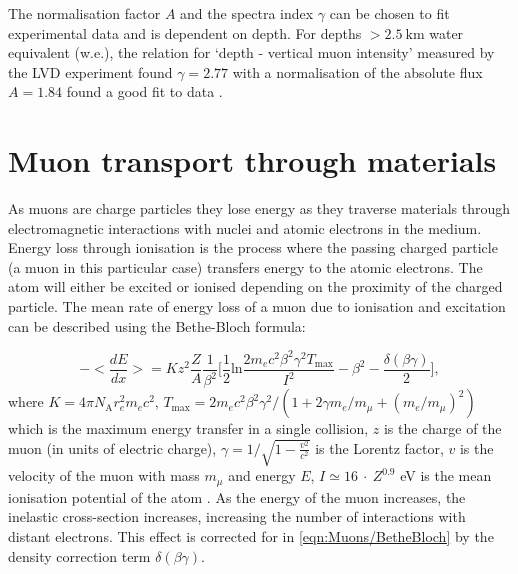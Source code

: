 The normalisation factor $A$ and the spectra index $\gamma$ can be chosen to fit experimental data and is dependent on depth. For depths $>2.5~\text{km}$ water equivalent (w.e.), the relation for `depth - vertical muon intensity' measured by the LVD experiment found $\gamma=2.77$ with a normalisation of the absolute flux $A=1.84$ found a good fit to data \cite{LVD:1998lir}.

\section{Muon transport through materials}\label{sec:Muons/MuonTransport}
As muons are charge particles they lose energy as they traverse materials through electromagnetic interactions with nuclei and atomic electrons in the medium. Energy loss through ionisation is the process where the passing charged particle (a muon in this particular case) transfers energy to the atomic electrons. The atom will either be excited or ionised depending on the proximity of the charged particle. The mean rate of energy loss of a muon due to ionisation and excitation can be described using the Bethe-Bloch formula:

\begin{equation}\label{eqn:Muons/BetheBloch}
    -\Biggl<\frac{dE}{dx}\Biggl>=Kz^2\frac{Z}{A}\frac{1}{\beta^2}\Biggl[ \frac{1}{2}\text{ln}\frac{2m_ec^2\beta^2\gamma^2T_{\text{max}}}{I^2}-\beta^2-\frac{\delta(\beta\gamma)}{2}\Biggl],
\end{equation}
where $K=4\pi N_\text{A}r_e^2m_ec^2$, $T_{\text{max}}=2m_ec^2\beta^2\gamma^2/(1+2\gamma m_e/m_\mu+(m_e/m_\mu)^2)$ which is the maximum energy transfer in a single collision, $z$ is the charge of the muon (in units of electric charge), $\gamma=1/\sqrt{1-\frac{v^2}{c^2}}$ is the Lorentz factor, $v$ is the velocity of the muon with mass $m_\mu$ and energy $E$, $I\simeq16\:\cdot\:Z^{0.9}$ eV is the mean ionisation potential of the atom \cite{GROOM2001183}. As the energy of the muon increases, the inelastic cross-section increases, increasing the number of interactions with distant electrons. This effect is corrected for in \autoref{eqn:Muons/BetheBloch} by the density correction term $\delta(\beta\gamma)$.

